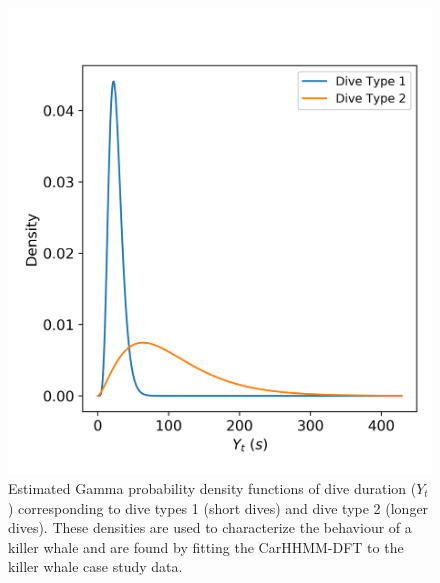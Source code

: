 \begin{figure}[ht]
	\centering
	\includegraphics[width=5in]{../Plots/CarHHMM2-coarse-emissions.png}
	\caption{Estimated Gamma probability density functions of dive duration ($Y_t$) corresponding to dive types 1 (short dives) and dive type 2 (longer dives). These  densities are used to characterize the behaviour of a killer whale and are found by fitting the CarHHMM-DFT to the killer whale case study data.}
	\label{fig:coarse_emis}
\end{figure}

